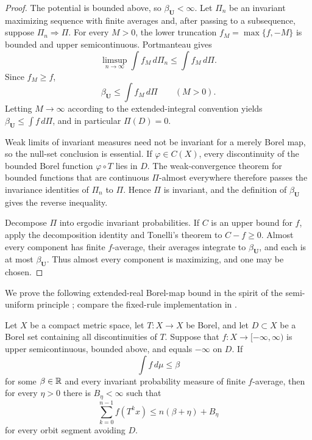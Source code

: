 \documentclass[letterpaper,twoside]{article}
\begin{document}
\begin{proof}
The potential is bounded above, so $\beta_{\bm U}<\infty$.  Let $\Pi_n$ be an
invariant maximizing sequence with finite averages and, after passing to a
subsequence, suppose $\Pi_n\Rightarrow\Pi$.  For every $M>0$, the lower
truncation $f_M=\max\{f,-M\}$ is bounded and upper semicontinuous.
Portmanteau gives
\[
 \limsup_{n\to\infty}\int f_M\,d\Pi_n
 \le\int f_M\,d\Pi.
\]
Since $f_M\ge f$,
\[
 \beta_{\bm U}\le\int f_M\,d\Pi
 \qquad(M>0).
\]
Letting $M\to\infty$ according to the extended-integral convention yields
$\beta_{\bm U}\le\int f\,d\Pi$, and in particular $\Pi(D)=0$.

Weak limits of invariant measures need not be invariant for a merely Borel
map, so the null-set conclusion is essential.  If $\varphi\in C(X)$, every
discontinuity of the bounded Borel function $\varphi\circ T$ lies in $D$.
The weak-convergence theorem for bounded functions that are continuous
$\Pi$-almost everywhere \cite[Sec.~2]{Billingsley1999} therefore passes the
invariance identities of $\Pi_n$ to $\Pi$.  Hence
$\Pi$ is invariant, and the definition of $\beta_{\bm U}$ gives the reverse
inequality.

Decompose $\Pi$ into ergodic invariant probabilities.  If $C$ is an
upper bound for $f$, apply the decomposition identity and Tonelli's theorem
to $C-f\ge0$.  Almost every component has finite $f$-average, their averages
integrate to $\beta_{\bm U}$, and each is at most $\beta_{\bm U}$.  Thus
almost every component is maximizing, and one may be chosen.
\end{proof}

We prove the following extended-real Borel-map bound in the spirit of the semi-uniform principle \cite{SturmanStark2000}; compare the fixed-rule implementation in \cite{YangYuan2026}.

\begin{proposition}\label{prop:semiuniform}
Let $X$ be a compact metric space, let $T:X\to X$ be Borel, and let $D\subset X$ be
a Borel set containing all discontinuities of $T$.  Suppose that
$f:X\to[-\infty,\infty)$ is upper
semicontinuous, bounded above, and equals $-\infty$ on $D$.  If
\[
 \int f\,d\mu\le\beta
\]
for some $\beta\in\mathbb R$ and every invariant probability measure of finite
$f$-average, then for every $\eta>0$ there is $B_\eta<\infty$ such that
\[
 \sum_{k=0}^{n-1}f(T^kx)
 \le n(\beta+\eta)+B_\eta
\]
for every orbit segment avoiding $D$.
\end{proposition}
\end{document}
